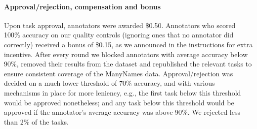 \documentclass[11pt,a4paper]{article}
\newcommand{\mn}{ManyNames\xspace}
\begin{document}
\paragraph{Approval/rejection, compensation and bonus}
Upon task approval, annotators were awarded \$0.50.
Annotators who scored 100\% accuracy on our quality controls (ignoring ones that no annotator did correctly) received a bonus of \$0.15, as we announced in the instructions for extra incentive.
After every round we blocked annotators with average accuracy below 90\%, removed their results from the dataset and republished the relevant tasks to ensure consistent coverage of the \mn data.
Approval/rejection was decided on a much lower threshold of 70\% accuracy, and with various mechanisms in place for more leniency, e.g., the first task below this threshold would be approved nonetheless; and any task below this threshold would be approved if the annotator's average accuracy was above 90\%.
We rejected less than 2\% of the tasks.



%
%
\end{document}
